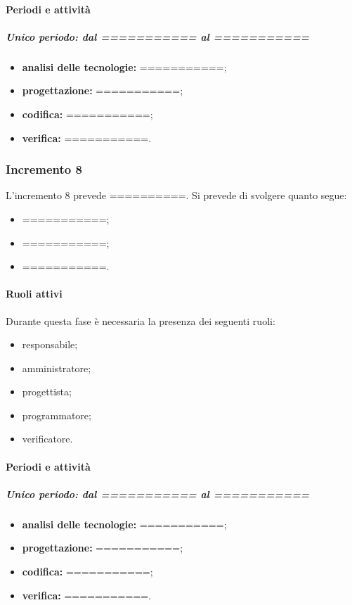 \paragraph{Periodi e attività}
\subparagraph{Unico periodo: dal =========== al ===========}
\begin{itemize}
	\item \textbf{analisi delle tecnologie:} ===========;
	\item \textbf{progettazione:} ===========;
	\item \textbf{codifica:} ===========;
	\item \textbf{verifica:} ===========.
\end{itemize}


\subsubsection{Incremento 8}
L'incremento 8 prevede ==========. Si prevede di svolgere quanto segue:
\begin{itemize}
	\item ===========;
	\item ===========;
	\item ===========.
\end{itemize}

\paragraph{Ruoli attivi}
Durante questa fase è necessaria la presenza dei seguenti ruoli: 
\begin{itemize} 
	\item responsabile; 
	\item amministratore; 
	\item progettista; 
	\item programmatore; 
	\item verificatore.
\end{itemize}

\paragraph{Periodi e attività}
\subparagraph{Unico periodo: dal =========== al ===========}
\begin{itemize}
	\item \textbf{analisi delle tecnologie:} ===========;
	\item \textbf{progettazione:} ===========;
	\item \textbf{codifica:} ===========;
	\item \textbf{verifica:} ===========.
\end{itemize}

